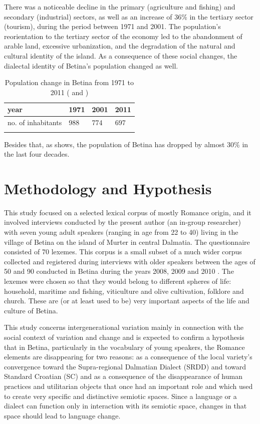 \documentclass[output=paper]{LSP/langsci}
\begin{document}
There was a noticeable decline in the primary (agriculture and fishing) and secondary (industrial) sectors, as well as an increase of 36\% in the tertiary sector (tourism), during the period between 1971 and 2001. The population’s reorientation to the tertiary sector of the economy led to the abandonment of arable land, excessive urbanization, and the degradation of the natural and cultural identity of the island. As a consequence of these social changes, the dialectal identity of Betina’s population changed as well.

\begin{table}
\begin{tabular}{llll}
\lsptoprule
year & 1971 & 2001 & 2011\\
\midrule
no.  of inhabitants & 988 & 774 & 697\\
\lspbottomrule
\end{tabular}
\caption{Population change in Betina from 1971 to 2011 (\citealt[15]{skracic_otok_2010} and \citealt{drzavni_zavod_za_statistiku_republike_hrvatske_1})}
\label{tab:2}
\end{table}

Besides that, as  shows, the population of Betina has dropped by almost 30\% in the last four decades.

\section{Methodology and Hypothesis}
This study focused on a selected lexical corpus of mostly Romance origin, and it involved interviews conducted by the present author (an in-group researcher) with seven young adult speakers (ranging in age from 22 to 40) living in the village of Betina on the island of Murter in central Dalmatia. The questionnaire consisted of 70 lexemes. This corpus is a small subset of a much wider corpus collected and registered during interviews with older speakers between the ages of 50 and 90 conducted in Betina during the years 2008, 2009 and 2010 \citep{skevin_etimoloska_2010}. The lexemes were chosen so that they would belong to different spheres of life: household, maritime and fishing, viticulture and olive cultivation, folklore and church. These are (or at least used to be) very important aspects of the life and culture of Betina. 

This study concerns intergenerational variation mainly in connection with the social context of variation and change and is expected to confirm a hypothesis that in Betina, particularly in the vocabulary of young speakers, the Romance elements are disappearing for two reasons: as a consequence of the local variety’s convergence toward the Supra-regional Dalmatian Dialect (SRDD) and toward Standard Croatian (SC) and as a consequence of the disappearance of human practices and utilitarian objects that once had an important role and which used to create very specific and distinctive semiotic spaces. Since a language or a dialect can function only in interaction with its semiotic space, changes in that space should lead to language change. 
\end{document}
